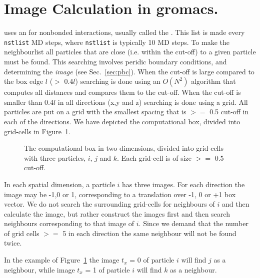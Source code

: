 \section{Image Calculation in gromacs.}
{\gromacs} uses an  for nonbonded interactions,
usually called the {\em {}}.
This list is made every {\tt nstlist} MD steps, where {\tt nstlist} is
typically 10 MD steps. 
To make the neighbourlist all particles that are close 
(i.e. within the cut-off) to a given particle must be found.
This searching involves peridic boundary conditions, and 
determining the {\em image} (see Sec.~\ref{sec:pbc}).
When the cut-off is large compared to the box edge $l$ ($>$ 0.4$l$)
searching is done using an $O(N^2)$ algorithm that computes
all distances and compares them to the cut-off.
When the cut-off is smaller than 0.4$l$ in all directions (x,y and z)
searching is done using a grid. All particles are put on a grid
with the smallest spacing that is $>=$ 0.5 cut-off in each of the directions.
We have depicted the computational box, divided into grid-cells in 
Figure~\ref{fig:nsgrid}.
\begin{figure}[ht]
\centerline{}
\caption{The computational box in two dimensions, divided into grid-cells with three particles, $i$, $j$ and $k$. Each grid-cell is of size $>=$ 0.5 cut-off.}
\label{fig:nsgrid}
\end{figure}
In each spatial dimension, a particle $i$ has three images. For each direction
the image may be -1,0 or 1, corresponding to a translation over -1, 0 or +1
box vector. We do not search the surrounding grid-cells for
neighbours of $i$ and then calculate the image, 
but rather construct the images first and then 
search neighbours corresponding to that image of $i$.
Since we demand that the number of grid cells $>=$ 5 in each direction 
the same neighbour will not be found twice.

In the example of Figure~\ref{fig:nsgrid} the image $t_x$ = 0 of particle
$i$ will find $j$ as a neighbour, while image $t_x$ = 1 of particle $i$
will find $k$ as a neighbour.
